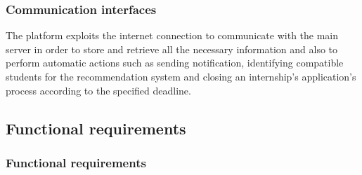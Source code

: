 \documentclass[11pt,twoside]{article}
\begin{document}
		\subsubsection{Communication interfaces}
The platform exploits the internet connection to communicate with the main server in order to store and retrieve all the necessary information and also to perform automatic actions such as sending notification, identifying compatible students for the recommendation system and closing an internship's application's process according to the specified deadline.
\newpage
	\subsection{Functional requirements}
		\subsubsection{Functional requirements}
\end{document}
